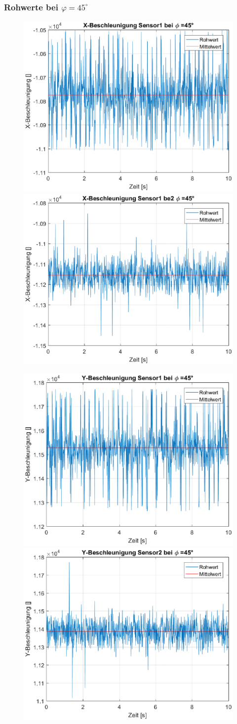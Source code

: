 \newpage
{\subsubsection{Rohwerte bei $\varphi = 45^{\circ}$}
\begin{figure}[h]
	\includegraphics[width=0.5\linewidth]{img/X1__dd___phi_45.eps}
	\includegraphics[width=0.5\linewidth]{img/X2__dd___phi_45.eps}
\end{figure}
\begin{figure}[h]
	\includegraphics[width=0.5\linewidth]{img/Y1__dd___phi_45.eps}
	\includegraphics[width=0.5\linewidth]{img/Y2__dd___phi_45.eps}
\end{figure}}

